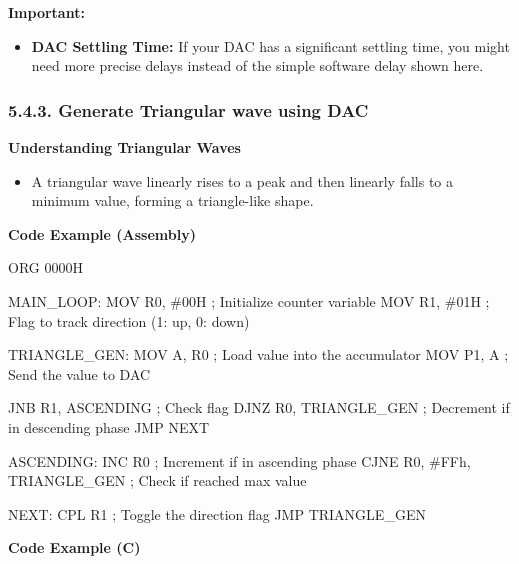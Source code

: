 \documentclass[
]{article}
\newenvironment{Shaded}{}{}
\newcommand{\NormalTok}[1]{#1}
\begin{document}
\textbf{Important:}

\begin{itemize}
\item
  \textbf{DAC Settling Time:} If your DAC has a significant settling
  time, you might need more precise delays instead of the simple
  software delay shown here.
\end{itemize}

\hypertarget{543-generate-triangular-wave-using-dac}{%
\subsubsection{5.4.3. Generate Triangular wave using
DAC}\label{543-generate-triangular-wave-using-dac}}

\textbf{Understanding Triangular Waves}

\begin{itemize}
\item
  A triangular wave linearly rises to a peak and then linearly falls to
  a minimum value, forming a triangle-like shape.
\end{itemize}

\textbf{Code Example (Assembly)}

\begin{Shaded}
\begin{Highlighting}[]
\NormalTok{ORG 0000H}

\NormalTok{MAIN\_LOOP:}
\NormalTok{    MOV R0, \#00H  ; Initialize counter variable}
\NormalTok{    MOV R1, \#01H  ; Flag to track direction (1: up, 0: down)}

\NormalTok{TRIANGLE\_GEN:}
\NormalTok{    MOV A, R0     ; Load value into the accumulator}
\NormalTok{    MOV P1, A     ; Send the value to DAC}

\NormalTok{    JNB R1, ASCENDING ; Check flag}
\NormalTok{    DJNZ R0, TRIANGLE\_GEN  ; Decrement if in descending phase}
\NormalTok{    JMP NEXT}

\NormalTok{ASCENDING:}
\NormalTok{    INC R0        ; Increment if in ascending phase}
\NormalTok{    CJNE R0, \#FFh, TRIANGLE\_GEN  ; Check if reached max value}

\NormalTok{NEXT:}
\NormalTok{    CPL R1        ; Toggle the direction flag}
\NormalTok{    JMP TRIANGLE\_GEN}
\end{Highlighting}
\end{Shaded}

\textbf{Code Example (C)}
\end{document}
